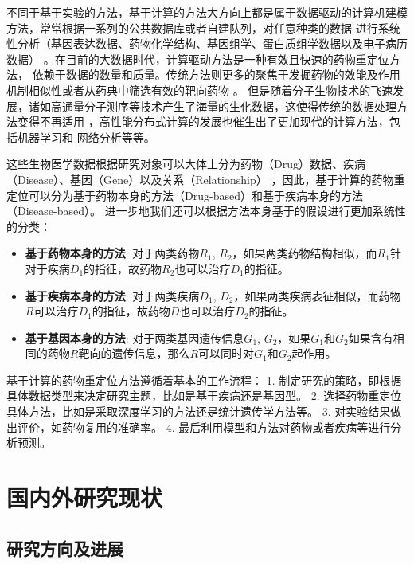 \par 不同于基于实验的方法，基于计算的方法大方向上都是属于数据驱动的计算机建模方法，常常根据一系列的公共数据库或者自建队列，对任意种类的数据
进行系统性分析（基因表达数据、药物化学结构、基因组学、蛋白质组学数据以及电子病历数据）
\cite{pushpakomDrugRepurposingProgress2019}。在目前的大数据时代，计算驱动方法是一种有效且快速的药物重定位方法，
依赖于数据的数量和质量。传统方法则更多的聚焦于发掘药物的效能及作用机制相似性或者从药典中筛选有效的靶向药物
\cite{keiserPredictingNewMolecular2009, iorioDiscoveryDrugMode2010}。
但是随着分子生物技术的飞速发展，诸如高通量分子测序等技术产生了海量的生化数据，这使得传统的数据处理方法变得不再适用
\cite{pushpakomDrugRepurposingProgress2019}，高性能分布式计算的发展也催生出了更加现代的计算方法，包括机器学习和
网络分析等等\cite{liSurveyCurrentTrends2016}。

\par 这些生物医学数据根据研究对象可以大体上分为药物（Drug）数据、疾病（Disease）、基因（Gene）以及关系（Relationship）
，因此，基于计算的药物重定位可以分为基于药物本身的方法（Drug-based）和基于疾病本身的方法（Disease-based）\cite{jaradaReviewComputationalDrug2020}。
进一步地我们还可以根据方法本身基于的假设进行更加系统性的分类：
\begin{itemize}
    \item \textbf{基于药物本身的方法}: 对于两类药物$R_1$, $R_2$，如果两类药物结构相似，而$R_1$针对于疾病$D_1$的指征，故药物$R_2$也可以治疗$D_1$的指征。
    \item \textbf{基于疾病本身的方法}: 对于两类疾病$D_1$, $D_2$，如果两类疾病表征相似，而药物$R$可以治疗$D_1$的指征，故药物$D$也可以治疗$D_2$的指征。
    \item \textbf{基于基因本身的方法}: 对于两类基因遗传信息$G_1$, $G_2$，如果$G_1$和$G_2$如果含有相同的药物$R$靶向的遗传信息，那么$R$可以同时对$G_1$和$G_2$起作用。
\end{itemize}

\par 基于计算的药物重定位方法遵循着基本的工作流程：
1. 制定研究的策略，即根据具体数据类型来决定研究主题，比如是基于疾病还是基因型。
2. 选择药物重定位具体方法，比如是采取深度学习的方法还是统计遗传学方法等。
3. 对实验结果做出评价，如药物复用的准确率。
4. 最后利用模型和方法对药物或者疾病等进行分析预测。

\section{国内外研究现状}

\subsection{研究方向及进展}
